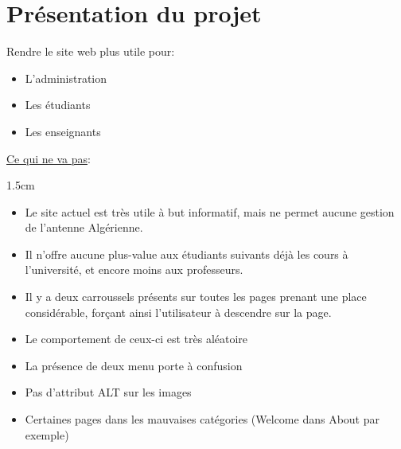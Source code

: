 \documentclass[oneside]{report}
\newcommand{\indentunder}{1.5cm}
\begin{document}
	\chapter{Présentation du projet}
	{
		\par Rendre le site web plus utile pour:
		\begin{itemize}
			\item{L'administration}
			\item{Les étudiants}
			\item{Les enseignants}
		\end{itemize}
		\vspace{1cm}
		\par\underline{Ce qui ne va pas}:
		\vspace{.5cm}
		\begin{adjustwidth}{\indentunder}{}
		\begin{itemize}
			\item Le site actuel est très utile à but informatif, mais ne permet aucune gestion de l'antenne Algérienne.
			\item Il n'offre aucune plus-value aux étudiants suivants déjà les cours à l'université, et encore moins aux professeurs.
			\item Il y a deux carroussels présents sur toutes les pages prenant une place considérable, forçant ainsi l'utilisateur à descendre sur la page.
			\item Le comportement de ceux-ci est très aléatoire
			\item La présence de deux menu porte à confusion
			\item Pas d'attribut ALT sur les images
			\item Certaines pages dans les mauvaises catégories (Welcome dans About par exemple)
		\end{itemize}
		\end{adjustwidth}
	\vspace{1cm}
}
\end{document}
